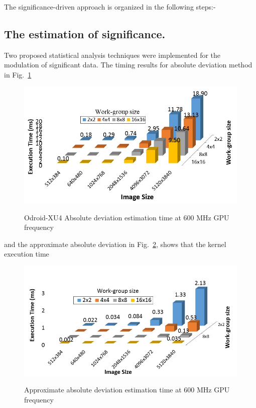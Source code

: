 \documentclass[journal]{IEEEtran}
\begin{document}
The significance-driven approach is organized in the following steps:-
\subsection{The estimation of significance.} 
Two proposed statistical analysis techniques were implemented for the modulation of significant data. The timing results for absolute deviation method in Fig.~\ref{fig:AbsDevTime600M}  
 \begin{figure}[b]
  \centering
    \caption{Odroid-XU4 Absolute deviation estimation time at 600 MHz GPU frequency}
    \includegraphics[width=\columnwidth]{AbsDevTime600M.jpg}
   \label{fig:AbsDevTime600M}
\end{figure}
and the approximate absolute deviation in Fig.~\ref{fig:ApproxAbsDevTime600M}, shows that the kernel execution time 
\begin{figure}[htbp]
  \centering
    \caption{Approximate absolute deviation estimation time at 600 MHz GPU frequency}
    \includegraphics[width=\columnwidth]{ApproxAbsDevTime600M.jpg}
  \label{fig:ApproxAbsDevTime600M}
\end{figure}
\end{document}
